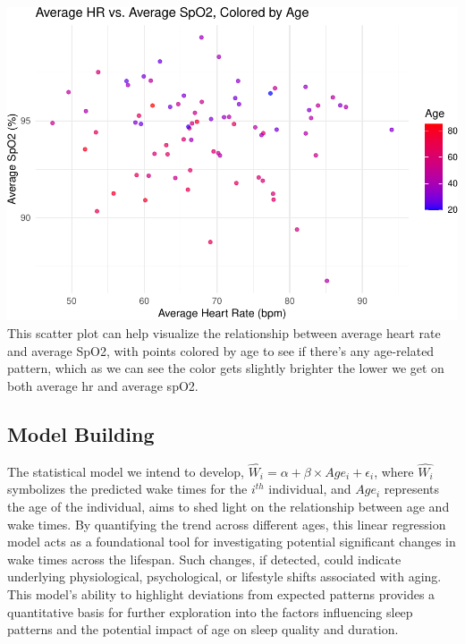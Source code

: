 \documentclass[
]{article}
\newenvironment{Shaded}{\begin{snugshade}}{\end{snugshade}}
\newcommand{\AttributeTok}[1]{\textcolor[rgb]{0.13,0.29,0.53}{#1}}
\newcommand{\FunctionTok}[1]{\textcolor[rgb]{0.13,0.29,0.53}{\textbf{#1}}}
\newcommand{\NormalTok}[1]{#1}
\newcommand{\OtherTok}[1]{\textcolor[rgb]{0.56,0.35,0.01}{#1}}
\newcommand{\SpecialCharTok}[1]{\textcolor[rgb]{0.81,0.36,0.00}{\textbf{#1}}}
\begin{document}
\includegraphics{602_project_files/figure-latex/unnamed-chunk-17-1.pdf}
This scatter plot can help visualize the relationship between average
heart rate and average SpO2, with points colored by age to see if
there's any age-related pattern, which as we can see the color gets
slightly brighter the lower we get on both average hr and average spO2.

\subsection{Model Building}\label{model-building-1}

The statistical model we intend to develop,
\(\hat{W_{i}} = \alpha + \beta \times Age_{i} + \epsilon_{i}\), where
\(\hat{W_{i}}\) symbolizes the predicted wake times for the \(i^{th}\)
individual, and \(Age_{i}\) represents the age of the individual, aims
to shed light on the relationship between age and wake times. By
quantifying the trend across different ages, this linear regression
model acts as a foundational tool for investigating potential
significant changes in wake times across the lifespan. Such changes, if
detected, could indicate underlying physiological, psychological, or
lifestyle shifts associated with aging. This model's ability to
highlight deviations from expected patterns provides a quantitative
basis for further exploration into the factors influencing sleep
patterns and the potential impact of age on sleep quality and duration.

\begin{Shaded}
\end{Shaded}
\end{document}
